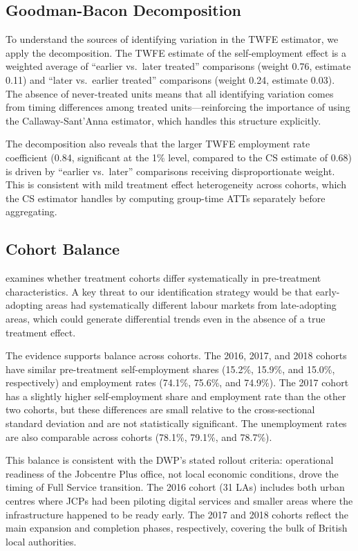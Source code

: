 \documentclass[12pt]{article}
\begin{document}
\subsection{Goodman-Bacon Decomposition}

To understand the sources of identifying variation in the TWFE estimator, we apply the \citet{goodman-baconDifferenceinDifferencesVariationTreatment2021} decomposition. The TWFE estimate of the self-employment effect is a weighted average of ``earlier vs.\ later treated'' comparisons (weight 0.76, estimate 0.11) and ``later vs.\ earlier treated'' comparisons (weight 0.24, estimate 0.03). The absence of never-treated units means that all identifying variation comes from timing differences among treated units---reinforcing the importance of using the Callaway-Sant'Anna estimator, which handles this structure explicitly.

The decomposition also reveals that the larger TWFE employment rate coefficient (0.84, significant at the 1\% level, compared to the CS estimate of 0.68) is driven by ``earlier vs.\ later'' comparisons receiving disproportionate weight. This is consistent with mild treatment effect heterogeneity across cohorts, which the CS estimator handles by computing group-time ATTs separately before aggregating.

\subsection{Cohort Balance}

 examines whether treatment cohorts differ systematically in pre-treatment characteristics. A key threat to our identification strategy would be that early-adopting areas had systematically different labour markets from late-adopting areas, which could generate differential trends even in the absence of a true treatment effect.

The evidence supports balance across cohorts. The 2016, 2017, and 2018 cohorts have similar pre-treatment self-employment shares (15.2\%, 15.9\%, and 15.0\%, respectively) and employment rates (74.1\%, 75.6\%, and 74.9\%). The 2017 cohort has a slightly higher self-employment share and employment rate than the other two cohorts, but these differences are small relative to the cross-sectional standard deviation and are not statistically significant. The unemployment rates are also comparable across cohorts (78.1\%, 79.1\%, and 78.7\%).

This balance is consistent with the DWP's stated rollout criteria: operational readiness of the Jobcentre Plus office, not local economic conditions, drove the timing of Full Service transition. The 2016 cohort (31 LAs) includes both urban centres where JCPs had been piloting digital services and smaller areas where the infrastructure happened to be ready early. The 2017 and 2018 cohorts reflect the main expansion and completion phases, respectively, covering the bulk of British local authorities.
\end{document}
